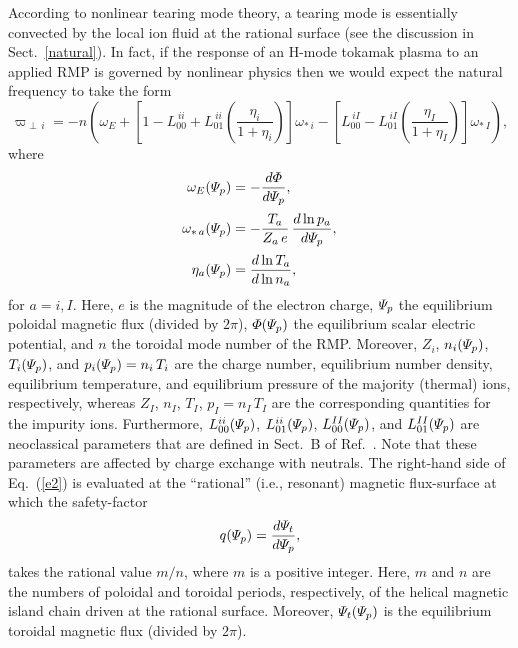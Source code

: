 \documentclass[12pt,prb,aps]{revtex4-1}
\begin{document}
According to nonlinear tearing mode theory, a tearing mode is essentially convected by
the local ion fluid at the rational surface (see the discussion in Sect.~\ref{natural}).\cite{nl1,nl2,nl3}
In fact, if the response of an H-mode tokamak plasma to an applied RMP
is governed by nonlinear physics then we would expect the
natural frequency to take the form\,\cite{rf2}
\begin{equation}\label{e2}
\varpi_{\perp\,i} = -n\left(\omega_E +\left[1-L_{00}^{\,ii}+L_{01}^{\,ii}\left(\frac{\eta_i}{1+\eta_i}\right)\right]
\omega_{\ast\,i}
-\left[L_{00}^{\,iI}- L_{01}^{\,iI}\left(\frac{\eta_I}{1+\eta_I}\right)\right]\omega_{\ast\,I}\right),
\end{equation}
where
\begin{align}
\omega_E({\mit\Psi}_p) &= -\frac{d{\mit\Phi}}{d{\mit\Psi}_p},\\[0.5ex]
\omega_{\ast\,a}({\mit\Psi}_p) &=-\frac{T_a}{Z_a\,e}\,\frac{d\ln p_a}{d{\mit\Psi}_p},\\[0.5ex]
\eta_a({\mit\Psi}_p)&=\frac{d\ln T_a}{d\ln n_a},
\end{align}
for $a=i, I$. 
Here,  $e$ is the magnitude of the electron charge, ${\mit\Psi}_p$  the equilibrium poloidal magnetic
flux (divided by $2\pi$), ${\mit\Phi}({\mit\Psi}_p)$ the equilibrium scalar
electric potential, and $n$ the toroidal mode number of the RMP.  Moreover, $Z_i$, $n_i({\mit\Psi}_p)$, $T_i({\mit\Psi}_p)$, and $p_i({\mit\Psi}_p)=n_i\,T_i$   are the charge number, 
equilibrium number density, 
equilibrium temperature, and equilibrium pressure
of the majority (thermal) ions, respectively,
whereas  $Z_I$, $n_I$, $T_I$, $p_I = n_I\,T_I$
are the corresponding quantities for the impurity ions.  
Furthermore, $L_{00}^{ii}({\mit\Psi}_p)$, $L_{01}^{ii}({\mit\Psi}_p)$,  $L_{00}^{II}({\mit\Psi}_p)$, and $L_{01}^{II}({\mit\Psi}_p)$ are neoclassical parameters that are defined
in Sect.~B of Ref.~. Note that these parameters are
affected by charge exchange  with neutrals. 
The right-hand side of Eq.~(\ref{e2}) is evaluated
at the ``rational''  (i.e., resonant) magnetic flux-surface at which the
safety-factor
\begin{equation}
q({\mit\Psi}_p)= \frac{d{\mit\Psi}_t}{d{\mit\Psi}_p},
\end{equation}
takes the rational value $m/n$, where $m$ is a positive integer. Here, $m$ and $n$ are the numbers of poloidal and
toroidal periods, respectively, of the helical magnetic island chain driven at the rational surface. Moreover, ${\mit\Psi}_t({\mit\Psi}_p)$ is the equilibrium toroidal magnetic flux (divided by $2\pi$).
\end{document}
